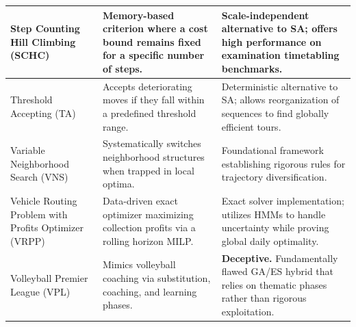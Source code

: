 \documentclass[orivec,runningheads]{llncs}
\begin{document}
\begin{center}
\begin{longtable}
\begin{center}
\begin{longtable}{
  >{\raggedright\arraybackslash}p{}
  >{\raggedright\arraybackslash}p{}
  >{\raggedright\arraybackslash}p{}
}
Step Counting Hill Climbing (SCHC) & Memory-based criterion where a cost bound remains fixed for a specific number of steps. & Scale-independent alternative to SA; offers high performance on examination timetabling benchmarks. \\ \midrule

Threshold Accepting (TA) & Accepts deteriorating moves if they fall within a predefined threshold range. & Deterministic alternative to SA; allows reorganization of sequences to find globally efficient tours. \\ \midrule

Variable Neighborhood Search (VNS) & Systematically switches neighborhood structures when trapped in local optima. & Foundational framework establishing rigorous rules for trajectory diversification. \\ \midrule

Vehicle Routing Problem with Profits Optimizer (VRPP) & Data-driven exact optimizer maximizing collection profits via a rolling horizon MILP. & Exact solver implementation; utilizes HMMs to handle uncertainty while proving global daily optimality. \\ \midrule

Volleyball Premier League (VPL) & Mimics volleyball coaching via substitution, coaching, and learning phases. & \textbf{Deceptive.} Fundamentally flawed GA/ES hybrid that relies on thematic phases rather than rigorous exploitation. \\ \bottomrule
\end{longtable}
\end{center}


\end{longtable}
\end{center}
\end{document}
